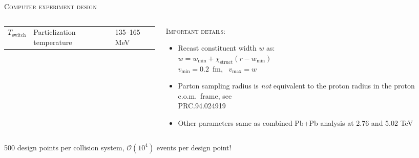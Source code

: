 \documentclass[aspectratio=169]{beamer}
\newcommand{\X}{\chi_\text{struct}}
\begin{document}
\begin{frame}[t]{\scshape Computer experiment design}
\begin{columns}[T]
\begin{column}{.6\textwidth}
\begin{tabular}{lll}
        $T_\text{switch}$ & Particlization temperature         & 135--165 MeV    \\
      \end{tabular}
    \end{column}
    \begin{column}{.4\textwidth}
      \textcolor{theme}{\scshape Important details:}
      \smallskip
      \begin{itemize}
        \small
        \item Recast constituent width $w$ as:\\[1ex]
          $w = w_\text{min} + \X(r - w_\text{min})$\\[1ex]
          $v_\text{min} = 0.2$~fm,~ $v_\text{max} = w$\\[1ex]
        \item Parton sampling radius is \emph{not} equivalent to the proton radius
          in the proton c.o.m.\ frame, see\\
          \textcolor{theme}{\scriptsize PRC.94.024919}\\[1ex]
        \item Other parameters same as combined Pb+Pb analysis at 2.76 and 5.02 TeV
      \end{itemize}
    \end{column}
  \end{columns}
  \begin{center}
    \color{theme}
    500 design points per collision system, $\mathcal{O}(10^4)$ events per design point!
  \end{center}
\end{frame}

\begin{frame}[plain]
\end{frame}
\end{document}
